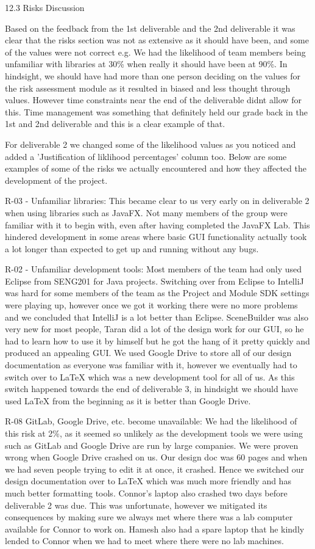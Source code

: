 12.3 Risks Discussion

Based on the feedback from the 1st deliverable and the 2nd deliverable it was clear that the risks section was not as extensive as it should have been, and some of the values were not correct e.g. We had the likelihood of team members being unfamiliar with libraries at 30\% when really it should have been at 90\%. In hindsight, we should have had more than one person deciding on the values for the risk assessment module as it resulted in biased and less thought through values. However time constraints near the end of the deliverable didnt allow for this. Time management was something that definitely held our grade back in the 1st and 2nd deliverable and this is a clear example of that.

For deliverable 2 we changed some of the likelihood values as you noticed and added a 'Justification of liklihood percentages' column too. Below are some examples of some of the risks we actually encountered and how they affected the development of the project.

R-03 - Unfamiliar libraries: This became clear to us very early on in deliverable 2 when using libraries such as JavaFX. Not many members of the group were familiar with it to begin with, even after having completed the JavaFX Lab. This hindered development in some areas where basic GUI functionality actually took a lot longer than expected to get up and running without any bugs.

R-02 - Unfamiliar development tools: Most members of the team had only used Eclipse from SENG201 for Java projects. Switching over from Eclipse to IntelliJ was hard for some members of the team as the Project and Module SDK settings were playing up, however once we got it working there were no more problems and we concluded that IntelliJ is a lot better than Eclipse.
SceneBuilder was also very new for most people, Taran did a lot of the design work for our GUI, so he had to learn how to use it by himself but he got the hang of it pretty quickly and produced an appealing GUI.
We used Google Drive to store all of our design documentation as everyone was familiar with it, however we eventually had to switch over to LaTeX which was a new development tool for all of us. As this switch happened towards the end of deliverable 3, in hindsight we should have used LaTeX from the beginning as it is better than Google Drive.

R-08 GitLab, Google Drive, etc. become unavailable: We had the likelihood of this risk at 2\%, as it seemed so unlikely as the development tools we were using such as GitLab and Google Drive are run by large companies. We were proven wrong when Google Drive crashed on us. Our design doc was 60 pages and when we had seven people trying to edit it at once, it crashed. Hence we switched our design documentation over to LaTeX which was much more friendly and has much better formatting tools.
Connor's laptop also crashed two days before deliverable 2 was due. This was unfortunate, however we mitigated its consequences by making sure we always met where there was a lab computer available for Connor to work on. Hamesh also had a spare laptop that he kindly lended to Connor when we had to meet where there were no lab machines.